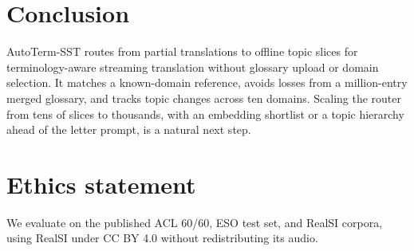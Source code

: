 \section{Conclusion}

AutoTerm-SST routes from partial translations to offline topic slices for
terminology-aware streaming translation without glossary upload or domain
selection. It matches a known-domain reference, avoids losses from a
million-entry merged glossary, and tracks topic changes across ten domains.
Scaling the router from tens of slices to thousands, with an embedding
shortlist or a topic hierarchy ahead of the letter prompt, is a natural next step.

\section*{Ethics statement}
We evaluate on the published ACL 60/60, ESO test set, and RealSI corpora,
using RealSI under CC BY 4.0 without redistributing its audio.
